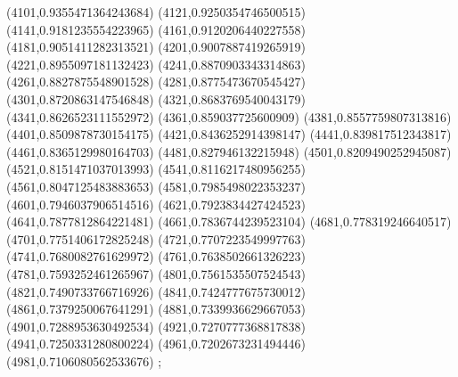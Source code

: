 {(4101,0.9355471364243684)
(4121,0.9250354746500515)
(4141,0.9181235554223965)
(4161,0.9120206440227558)
(4181,0.9051411282313521)
(4201,0.9007887419265919)
(4221,0.8955097181132423)
(4241,0.8870903343314863)
(4261,0.8827875548901528)
(4281,0.8775473670545427)
(4301,0.8720863147546848)
(4321,0.8683769540043179)
(4341,0.8626523111552972)
(4361,0.859037725600909)
(4381,0.8557759807313816)
(4401,0.8509878730154175)
(4421,0.8436252914398147)
(4441,0.839817512343817)
(4461,0.8365129980164703)
(4481,0.827946132215948)
(4501,0.8209490252945087)
(4521,0.8151471037013993)
(4541,0.8116217480956255)
(4561,0.8047125483883653)
(4581,0.7985498022353237)
(4601,0.7946037906514516)
(4621,0.7923834427424523)
(4641,0.7877812864221481)
(4661,0.7836744239523104)
(4681,0.778319246640517)
(4701,0.7751406172825248)
(4721,0.7707223549997763)
(4741,0.7680082761629972)
(4761,0.7638502661326223)
(4781,0.7593252461265967)
(4801,0.7561535507524543)
(4821,0.7490733766716926)
(4841,0.7424777675730012)
(4861,0.7379250067641291)
(4881,0.7339936629667053)
(4901,0.7288953630492534)
(4921,0.7270777368817838)
(4941,0.7250331280800224)
(4961,0.7202673231494446)
(4981,0.7106080562533676)
};
